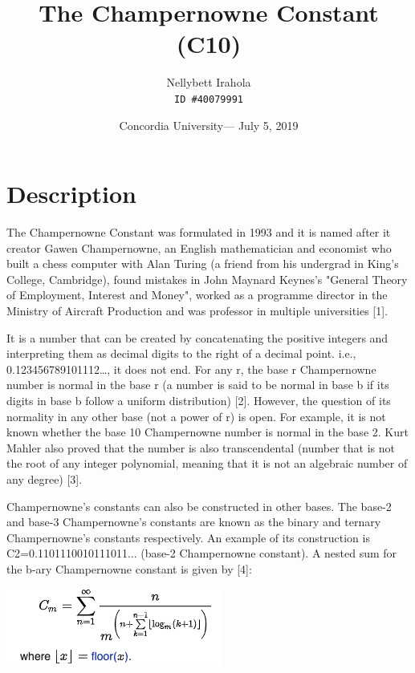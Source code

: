 \documentclass{article}
\title{\vspace{-2cm}The Champernowne Constant (C10)} %
\author{Nellybett Irahola\\ \texttt{ID \#40079991}} %
\date{Concordia University--- July 5, 2019} %
\begin{document}
\maketitle %


\section*{Description} %

The Champernowne Constant was formulated in 1993 and it is named after it creator Gawen Champernowne, an English mathematician and economist who built a chess computer with Alan Turing (a friend from his undergrad in King’s College, Cambridge), found mistakes in John Maynard Keynes's "General Theory of Employment, Interest and Money", worked as a programme director in the Ministry of Aircraft Production and was professor in multiple universities [1].  

It is a number that can be created by concatenating the positive integers and interpreting them as decimal digits to the right of a decimal point. i.e., 0.123456789101112…, it does not end. For any r, the base r Champernowne number is normal in the base r (a number is said to be normal in base b if its digits in base b follow a uniform distribution) [2]. However, the question of its normality in any other base (not a power of r) is open. For example, it is not known whether the base 10 Champernowne number is normal in the base 2. Kurt Mahler also proved that the number is also transcendental (number that is not the root of any integer polynomial, meaning that it is not an algebraic number of any degree) [3]. 

Champernowne’s constants can also be constructed in other bases. The base-2 and base-3 Champernowne’s constants are known as the binary and ternary Champernowne’s constants respectively. An example of its construction is C2=0.1101110010111011... (base-2 Champernowne constant). A nested sum for the b-ary Champernowne constant is given by [4]:

\includegraphics [scale=0.7]{images/formula.png} 
\end{document}
